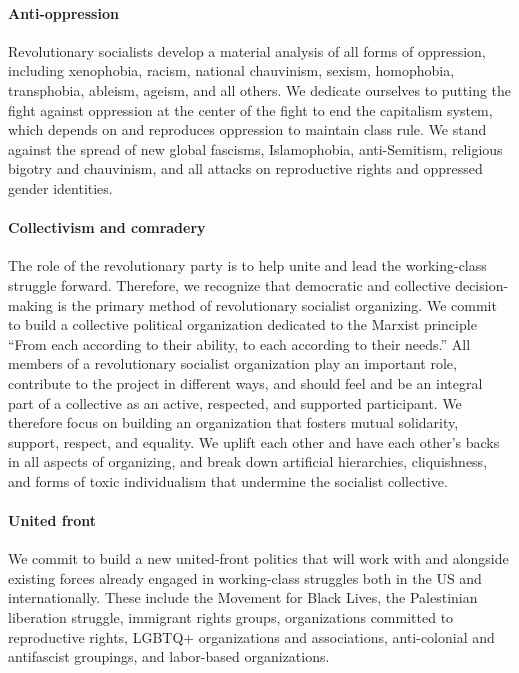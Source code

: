 \paragraph{Anti-oppression}

Revolutionary socialists develop a material analysis of all forms of oppression, including xenophobia, racism, national chauvinism, sexism, homophobia, transphobia, ableism, ageism, and all others. We dedicate ourselves to putting the fight against oppression at the center of the fight to end the capitalism system, which depends on and reproduces oppression to maintain class rule. We stand against the spread of new global fascisms, Islamophobia, anti-Semitism, religious bigotry and chauvinism, and all attacks on reproductive rights and oppressed gender identities.

\paragraph{Collectivism and comradery}

The role of the revolutionary party is to help unite and lead the working-class struggle forward. Therefore, we recognize that democratic and collective decision-making is the primary method of revolutionary socialist organizing. We commit to build a collective political organization dedicated to the Marxist principle ``From each according to their ability, to each according to their needs.'' All members of a revolutionary socialist organization play an important role, contribute to the project in different ways, and should feel and be an integral part of a collective as an active, respected, and supported participant. We therefore focus on building an organization that fosters mutual solidarity, support, respect, and equality. We uplift each other and have each other's backs in all aspects of organizing, and break down artificial hierarchies, cliquishness, and forms of toxic individualism that undermine the socialist collective.

\paragraph{United front}

We commit to build a new united-front politics that will work with and alongside existing forces already engaged in working-class struggles both in the US and internationally. These include the Movement for Black Lives, the Palestinian liberation struggle, immigrant rights groups, organizations committed to reproductive rights, LGBTQ+ organizations and associations, anti-colonial and antifascist groupings, and labor-based organizations.

